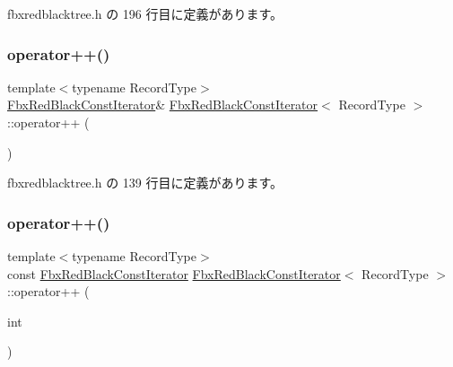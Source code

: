  fbxredblacktree.\+h の 196 行目に定義があります。

\mbox{\label{class_fbx_red_black_const_iterator_a75bbaa3d7e877d62ad4c925251c9a0c4}} 
\subsubsection{\texorpdfstring{operator++()}{operator++()}\hspace{0.1cm}{\footnotesize\ttfamily [1/2]}}
{\footnotesize\ttfamily template$<$typename Record\+Type$>$ \\
\hyperlink{class_fbx_red_black_const_iterator}{Fbx\+Red\+Black\+Const\+Iterator}\& \hyperlink{class_fbx_red_black_const_iterator}{Fbx\+Red\+Black\+Const\+Iterator}$<$ Record\+Type $>$\+::operator++ (\begin{DoxyParamCaption}{ }\end{DoxyParamCaption})\hspace{0.3cm}{\ttfamily [inline]}}



 fbxredblacktree.\+h の 139 行目に定義があります。

\mbox{\label{class_fbx_red_black_const_iterator_a6f685ed6ec9a5ce0bb540d8895e20a92}} 
\subsubsection{\texorpdfstring{operator++()}{operator++()}\hspace{0.1cm}{\footnotesize\ttfamily [2/2]}}
{\footnotesize\ttfamily template$<$typename Record\+Type$>$ \\
const \hyperlink{class_fbx_red_black_const_iterator}{Fbx\+Red\+Black\+Const\+Iterator} \hyperlink{class_fbx_red_black_const_iterator}{Fbx\+Red\+Black\+Const\+Iterator}$<$ Record\+Type $>$\+::operator++ (\begin{DoxyParamCaption}\item[{int}]{ }\end{DoxyParamCaption})\hspace{0.3cm}{\ttfamily [inline]}}



